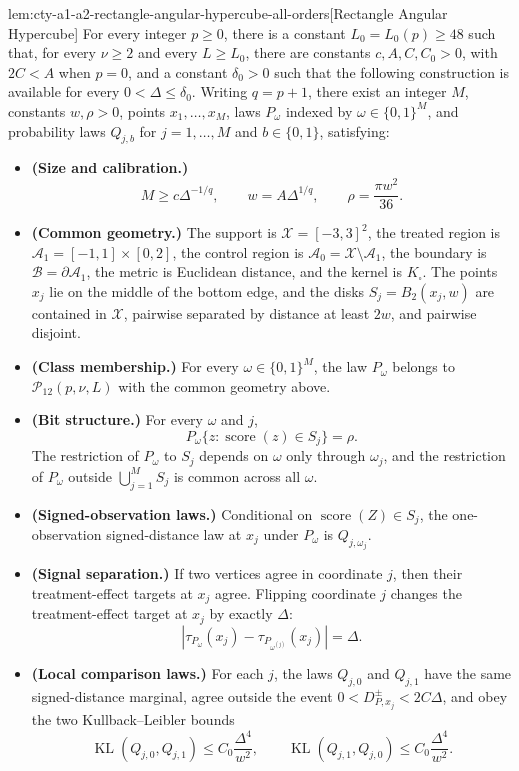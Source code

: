 \begin{lemmav}{lem:cty-a1-a2-rectangle-angular-hypercube-all-orders}[Rectangle Angular Hypercube]
For every integer \(p\geq 0\), there is a constant \(L_0=L_0(p)\geq 48\) such that, for every \(\nu\geq 2\) and every \(L\geq L_0\), there are constants \(c,A,C,C_0>0\), with \(2C<A\) when \(p=0\), and a constant \(\delta_0>0\) such that the following construction is available for every \(0<\Delta\leq\delta_0\).  Writing \(q=p+1\), there exist an integer \(M\), constants \(w,\rho>0\), points \(x_1,\ldots,x_M\), laws \(P_\omega\) indexed by \(\omega\in\{0,1\}^M\), and probability laws \(Q_{j,b}\) for \(j=1,\ldots,M\) and \(b\in\{0,1\}\), satisfying:
\begin{itemize}
\item \textbf{(Size and calibration.)}
\[
M\geq c\Delta^{-1/q},\qquad
w=A\Delta^{1/q},\qquad
\rho=\frac{\pi w^2}{36}.
\]
\item \textbf{(Common geometry.)} The support is \(\mathcal X=[-3,3]^2\), the treated region is \(\mathcal A_1=[-1,1]\times[0,2]\), the control region is \(\mathcal A_0=\mathcal X\setminus\mathcal A_1\), the boundary is \(\mathcal B=\partial\mathcal A_1\), the metric is Euclidean distance, and the kernel is \(K_\square\).  The points \(x_j\) lie on the middle of the bottom edge, and the disks \(S_j=B_2(x_j,w)\) are contained in \(\mathcal X\), pairwise separated by distance at least \(2w\), and pairwise disjoint.
\item \textbf{(Class membership.)} For every \(\omega\in\{0,1\}^M\), the law \(P_\omega\) belongs to \(\mathcal P_{12}(p,\nu,L)\) with the common geometry above.
\item \textbf{(Bit structure.)} For every \(\omega\) and \(j\),
\[
P_\omega\{z:\operatorname{score}(z)\in S_j\}=\rho.
\]
The restriction of \(P_\omega\) to \(S_j\) depends on \(\omega\) only through \(\omega_j\), and the restriction of \(P_\omega\) outside \(\bigcup_{j=1}^M S_j\) is common across all \(\omega\).
\item \textbf{(Signed-observation laws.)} Conditional on \(\operatorname{score}(Z)\in S_j\), the one-observation signed-distance law at \(x_j\) under \(P_\omega\) is \(Q_{j,\omega_j}\).
\item \textbf{(Signal separation.)} If two vertices agree in coordinate \(j\), then their treatment-effect targets at \(x_j\) agree.  Flipping coordinate \(j\) changes the treatment-effect target at \(x_j\) by exactly \(\Delta\):
\[
\left|\tau_{P_\omega}(x_j)-\tau_{P_{\omega^{(j)}}}(x_j)\right|=\Delta.
\]
\item \textbf{(Local comparison laws.)} For each \(j\), the laws \(Q_{j,0}\) and \(Q_{j,1}\) have the same signed-distance marginal, agree outside the event \(0<D^\pm_{P,x_j}<2C\Delta\), and obey the two Kullback--Leibler bounds
\[
\operatorname{KL}(Q_{j,0},Q_{j,1})\leq C_0\frac{\Delta^4}{w^2},
\qquad
\operatorname{KL}(Q_{j,1},Q_{j,0})\leq C_0\frac{\Delta^4}{w^2}.
\]
\end{itemize}
\end{lemmav}

